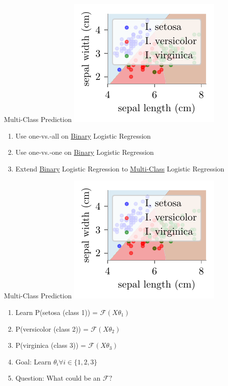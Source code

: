 \documentclass{beamer}
\begin{document}
\begin{frame}{Multi-Class Prediction}
\includegraphics{../assets/logistic-regression/figures/logisitic-iris-prediction.pdf}
\pause \begin{enumerate}
\item Use one-vs.-all on \underline{Binary} Logistic Regression
\item Use one-vs.-one on \underline{Binary} Logistic Regression
\item Extend \underline{Binary} Logistic Regression to \underline{Multi-Class} Logistic Regression
\end{enumerate}
\end{frame}

\begin{frame}{Multi-Class Prediction}
\includegraphics[scale=0.8]{../assets/logistic-regression/figures/logisitic-iris-prediction.pdf}
\pause \begin{enumerate}
	\item Learn P(setosa (class 1)) = $\mathcal{F}({X\theta_1})$
	\item P(versicolor (class 2)) = $\mathcal{F}({X\theta_2})$
	\item P(virginica (class 3)) = $\mathcal{F}({X\theta_3})$
	\item Goal: Learn $\theta_i \forall i \in \{1, 2, 3\}$
	\item Question: What could be an $\mathcal{F}?$

\end{enumerate}


\end{frame}
\end{document}
